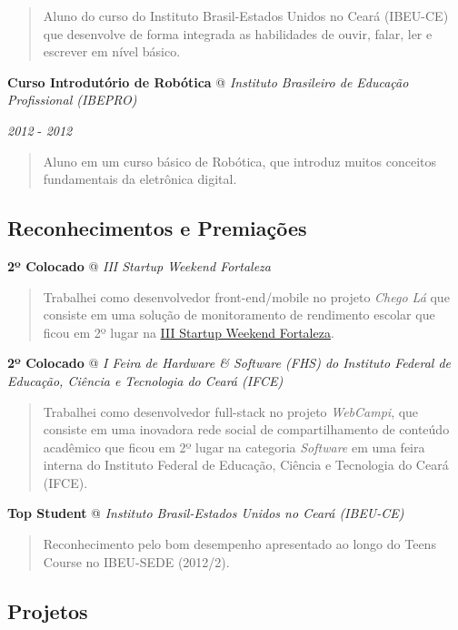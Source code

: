 \documentclass[]{article}
\begin{document}
\begin{quote}
Aluno do curso do Instituto Brasil-Estados Unidos no Ceará (IBEU-CE) que
desenvolve de forma integrada as habilidades de ouvir, falar, ler e
escrever em nível básico.
\end{quote}

\textbf{Curso Introdutório de Robótica} @ \emph{Instituto Brasileiro de
Educação Profissional (IBEPRO)}

\emph{2012} - \emph{2012}

\begin{quote}
Aluno em um curso básico de Robótica, que introduz muitos conceitos
fundamentais da eletrônica digital.
\end{quote}

\subsection{Reconhecimentos e
Premiações}\label{reconhecimentos-e-premiauxe7uxf5es}

\textbf{2º Colocado} @ \emph{III Startup Weekend Fortaleza}

\begin{quote}
Trabalhei como desenvolvedor front-end/mobile no projeto \emph{Chego Lá}
que consiste em uma solução de monitoramento de rendimento escolar que
ficou em 2º lugar na
\href{http://www.up.co/communities/brazil/fortaleza/startup-weekend/4487}{III
Startup Weekend Fortaleza}.
\end{quote}

\textbf{2º Colocado} @ \emph{I Feira de Hardware \& Software (FHS) do
Instituto Federal de Educação, Ciência e Tecnologia do Ceará (IFCE)}

\begin{quote}
Trabalhei como desenvolvedor full-stack no projeto \emph{WebCampi}, que
consiste em uma inovadora rede social de compartilhamento de conteúdo
acadêmico que ficou em 2º lugar na categoria \emph{Software} em uma
feira interna do Instituto Federal de Educação, Ciência e Tecnologia do
Ceará (IFCE).
\end{quote}

\textbf{Top Student} @ \emph{Instituto Brasil-Estados Unidos no Ceará
(IBEU-CE)}

\begin{quote}
Reconhecimento pelo bom desempenho apresentado ao longo do Teens Course
no IBEU-SEDE (2012/2).
\end{quote}

\subsection{Projetos}\label{projetos}
\end{document}
